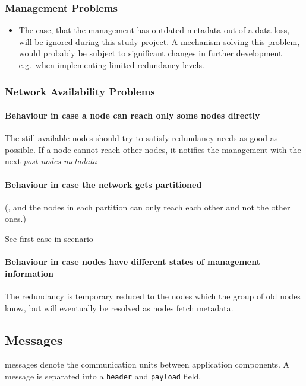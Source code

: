 \subsubsection{Management Problems}\label{sec:scenario-management-problems}
\begin{itemize}
    \item The case, that the \gls{management} has outdated \gls{metadata} out of a data loss, will be ignored during this study project. A mechanism solving this problem, would probably be subject to significant changes in further development e.g.\ when implementing limited redundancy levels. %
\end{itemize}

\subsubsection{Network Availability Problems}\label{sec:scenario-network-errors}
\paragraph{Behaviour in case a node can reach only some nodes directly}
The still available \glspl{node} should try to satisfy redundancy needs as good as possible.
If a \gls{node} cannot reach other \glspl{node}, it notifies the \gls{management} with the next \emph{post nodes metadata}

\paragraph{Behaviour in case the network gets partitioned}
(, and the \glspl{node} in each partition can only reach each other and not the other ones.)

See first case in scenario~

\paragraph{Behaviour in case nodes have different states of management information}
The redundancy is temporary reduced to the \glspl{node} which the group of old \glspl{node} know, but will eventually be resolved as \glspl{node} fetch \gls{metadata}.


\subsection{Messages}\label{sec:messages}
\Glspl{message} denote the communication units between application components. A \gls{message} is separated into a \texttt{header} and \texttt{payload} field.

